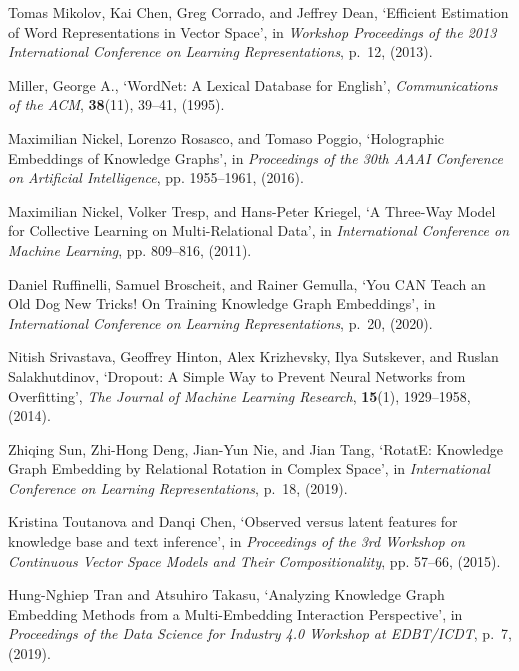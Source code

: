 \documentclass{ecai}
\theoremstyle{plain}  \newtheorem{thm}{Theorem}  \newtheorem{lem}[thm]{Lemma}  \newtheorem{prop}[thm]{Proposition}
\theoremstyle{remark}  \newtheorem*{rem}{Remark}
\begin{document}
\begin{thebibliography}{10}
Tomas Mikolov, Kai Chen, Greg Corrado, and Jeffrey Dean, `Efficient
  {{Estimation}} of {{Word Representations}} in {{Vector Space}}', in {\em
  Workshop {{Proceedings}} of the 2013 {{International Conference}} on
  {{Learning Representations}}}, p.~12, (2013).

{Miller, George A.}, `{{WordNet}}: A {{Lexical Database}} for {{English}}',
  {\em Communications of the ACM}, {\bf 38}(11),  39--41, (1995).

Maximilian Nickel, Lorenzo Rosasco, and Tomaso Poggio, `Holographic
  {{Embeddings}} of {{Knowledge Graphs}}', in {\em Proceedings of the 30th
  {{AAAI Conference}} on {{Artificial Intelligence}}}, pp. 1955--1961, (2016).

Maximilian Nickel, Volker Tresp, and Hans-Peter Kriegel, `A {{Three-Way Model}}
  for {{Collective Learning}} on {{Multi-Relational Data}}', in {\em
  International {{Conference}} on {{Machine Learning}}}, pp. 809--816, (2011).

Daniel Ruffinelli, Samuel Broscheit, and Rainer Gemulla, `You {{CAN Teach}} an
  {{Old Dog New Tricks}}! {{On Training Knowledge Graph Embeddings}}', in {\em
  International {{Conference}} on {{Learning Representations}}}, p.~20, (2020).

Nitish Srivastava, Geoffrey Hinton, Alex Krizhevsky, Ilya Sutskever, and Ruslan
  Salakhutdinov, `Dropout: {{A Simple Way}} to {{Prevent Neural Networks}} from
  {{Overfitting}}', {\em The Journal of Machine Learning Research}, {\bf
  15}(1),  1929--1958, (2014).

Zhiqing Sun, Zhi-Hong Deng, Jian-Yun Nie, and Jian Tang, `{{RotatE}}:
  {{Knowledge Graph Embedding}} by {{Relational Rotation}} in {{Complex
  Space}}', in {\em International {{Conference}} on {{Learning
  Representations}}}, p.~18, (2019).

Kristina Toutanova and Danqi Chen, `Observed versus latent features for
  knowledge base and text inference', in {\em Proceedings of the 3rd
  {{Workshop}} on {{Continuous Vector Space Models}} and Their
  {{Compositionality}}}, pp. 57--66, (2015).

Hung-Nghiep Tran and Atsuhiro Takasu, `Analyzing {{Knowledge Graph Embedding
  Methods}} from a {{Multi-Embedding Interaction Perspective}}', in {\em
  Proceedings of the {{Data Science}} for {{Industry}} 4.0 {{Workshop}} at
  {{EDBT}}/{{ICDT}}}, p.~7, (2019).


\end{thebibliography}
\end{document}
